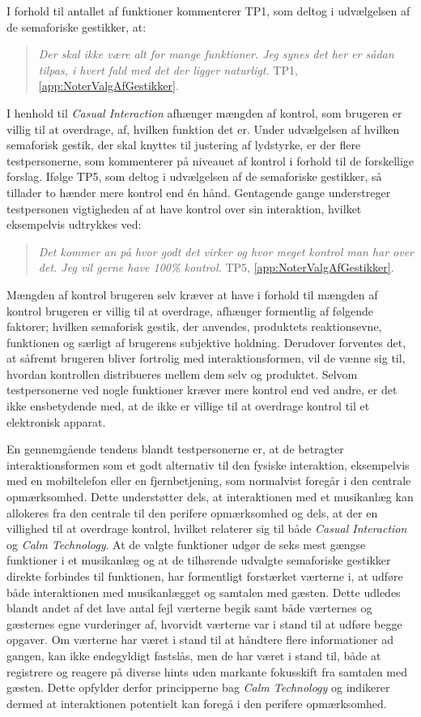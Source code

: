 I forhold til antallet af funktioner kommenterer TP1, som deltog i udvælgelsen af de semaforiske gestikker, at: 
%
\begin{quotation}
	\noindent
	\textit{Der skal ikke være alt for mange funktioner. Jeg synes det her er sådan tilpas, i hvert fald med det der ligger naturligt.} TP1, \autoref{app:NoterValgAfGestikker}.
\noindent
\end{quotation}
%
I henhold til \textit{Casual Interaction} afhænger mængden af kontrol, som brugeren er villig til at overdrage, af, hvilken funktion det er. Under udvælgelsen af hvilken semaforisk gestik, der skal knyttes til justering af lydstyrke, er der flere testpersonerne, som kommenterer på niveauet af kontrol i forhold til de forskellige forslag. Ifølge TP5, som deltog i udvælgelsen af de semaforiske gestikker, så tillader to hænder mere kontrol end én hånd. Gentagende gange understreger testpersonen vigtigheden af at have kontrol over sin interaktion, hvilket eksempelvis udtrykkes ved: 
%
\begin{quotation}
	\noindent
	\textit{Det kommer an på hvor godt det virker og hvor meget kontrol man har over det. Jeg vil gerne have 100\% kontrol.} TP5, \autoref{app:NoterValgAfGestikker}.
\noindent
\end{quotation}
%
Mængden af kontrol brugeren selv kræver at have i forhold til mængden af kontrol brugeren er villig til at overdrage, afhænger formentlig af følgende faktorer; hvilken semaforisk gestik, der anvendes, produktets reaktionsevne, funktionen og særligt af brugerens subjektive holdning. Derudover forventes det, at såfremt brugeren bliver fortrolig med interaktionsformen, vil de vænne sig til, hvordan kontrollen distribueres mellem dem selv og produktet. Selvom testpersonerne ved nogle funktioner kræver mere kontrol end ved andre, er det ikke ensbetydende med, at de ikke er villige til at overdrage kontrol til et elektronisk apparat. 

En gennemgående tendens blandt testpersonerne er, at de betragter interaktionsformen som et godt alternativ til den fysiske interaktion, eksempelvis med en mobiltelefon eller en fjernbetjening, som normalvist foregår i den centrale opmærksomhed. Dette understøtter dels, at interaktionen med et musikanlæg kan allokeres fra den centrale til den perifere opmærksomhed og dels, at der en villighed til at overdrage kontrol, hvilket relaterer sig til både \textit{Casual Interaction} og \textit{Calm Technology}. \blankline
%
At de valgte funktioner udgør de seks mest gængse funktioner i et musikanlæg og at de tilhørende udvalgte semaforiske gestikker direkte forbindes til funktionen, har formentligt forstærket værterne i, at udføre både interaktionen med musikanlægget og samtalen med gæsten. Dette udledes blandt andet af det lave antal fejl værterne begik samt både værternes og gæsternes egne vurderinger af, hvorvidt værterne var i stand til at udføre begge opgaver. Om værterne har været i stand til at håndtere flere informationer ad gangen, kan ikke endegyldigt fastslås, men de har været i stand til, både at registrere og reagere på diverse hints uden markante fokusskift fra samtalen med gæsten. Dette opfylder derfor principperne bag \textit{Calm Technology} og indikerer dermed at interaktionen potentielt kan foregå i den perifere opmærksomhed.

